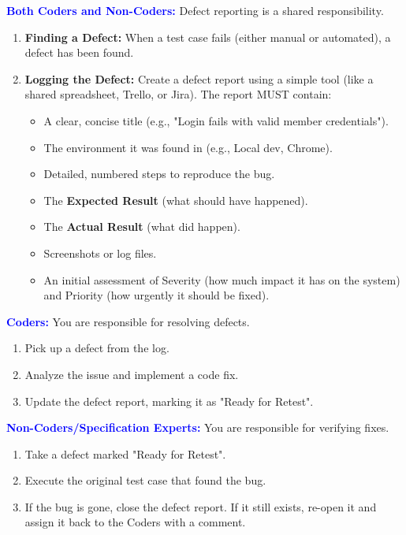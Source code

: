 \documentclass{article}
\newcommand{\role}[1]{\textbf{\textcolor{blue}{#1:}}}
\begin{document}
\role{Both Coders and Non-Coders}
Defect reporting is a shared responsibility.
\begin{enumerate}
    \item \textbf{Finding a Defect:} When a test case fails (either manual or automated), a defect has been found.
    \item \textbf{Logging the Defect:} Create a defect report using a simple tool (like a shared spreadsheet, Trello, or Jira). The report MUST contain:
    \begin{itemize}
        \item[--] A clear, concise title (e.g., "Login fails with valid member credentials").
        \item[--] The environment it was found in (e.g., Local dev, Chrome).
        \item[--] Detailed, numbered steps to reproduce the bug.
        \item[--] The \textbf{Expected Result} (what should have happened).
        \item[--] The \textbf{Actual Result} (what did happen).
        \item[--] Screenshots or log files.
        \item[--] An initial assessment of Severity (how much impact it has on the system) and Priority (how urgently it should be fixed).
    \end{itemize}
\end{enumerate}

\role{Coders}
You are responsible for resolving defects.
\begin{enumerate}
    \item Pick up a defect from the log.
    \item Analyze the issue and implement a code fix.
    \item Update the defect report, marking it as "Ready for Retest".
\end{enumerate}

\role{Non-Coders/Specification Experts}
You are responsible for verifying fixes.
\begin{enumerate}
    \item Take a defect marked "Ready for Retest".
    \item Execute the original test case that found the bug.
    \item If the bug is gone, close the defect report. If it still exists, re-open it and assign it back to the Coders with a comment.
\end{enumerate}
\end{document}
